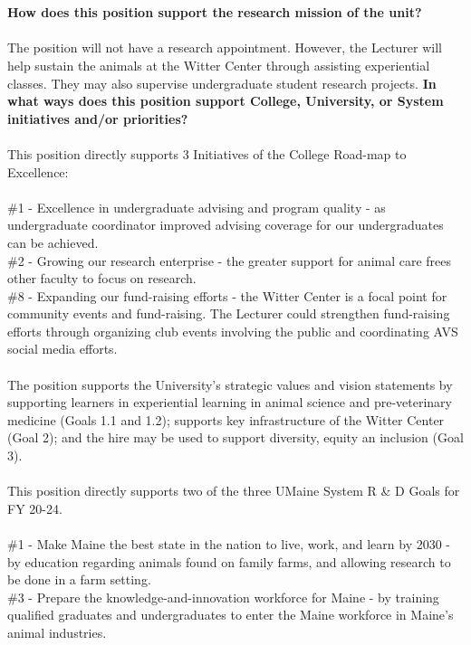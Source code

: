 \documentclass[11pt]{article}
\begin{document}
\\~\\
\textbf{\rmfamily How does this position support the research mission of the unit?}\\~\\
The position will not have a research appointment. However,  the Lecturer will help sustain the animals at the Witter Center through assisting experiential classes. They may also supervise undergraduate student research projects. 
\newpage
\noindent\textbf{\rmfamily In what ways does this position support College, University, or System initiatives and/or priorities?}
\\~\\
This position directly supports 3 Initiatives of the College Road-map to Excellence:\\\\
\#1 - Excellence in undergraduate advising and program quality - as undergraduate coordinator improved advising coverage for our undergraduates can be achieved.\\
\#2 - Growing our research enterprise - the greater support for animal care frees other faculty to focus on research.\\
\#8 - Expanding our fund-raising efforts - the Witter Center is a focal point for community events and fund-raising. The Lecturer could strengthen fund-raising efforts through organizing club events involving the public and coordinating AVS social media efforts.
\\~\\
The position supports the University's strategic values and vision statements by supporting learners in experiential learning in animal science and pre-veterinary medicine (Goals 1.1 and 1.2); supports key infrastructure of the Witter Center (Goal 2); and the hire may be used to support diversity, equity an inclusion  (Goal 3).\\~\\
This position directly supports two of the three UMaine System R \& D Goals for FY 20-24.\\~\\ 
\#1 - Make Maine the best state in the nation to live, work, and learn by 2030 - by education regarding animals found on family farms, and allowing research to be done in a farm setting.\\
\#3 - Prepare the knowledge-and-innovation workforce for Maine - by training qualified graduates and undergraduates to enter the Maine workforce in Maine's animal industries.\\~\\
\end{document}
